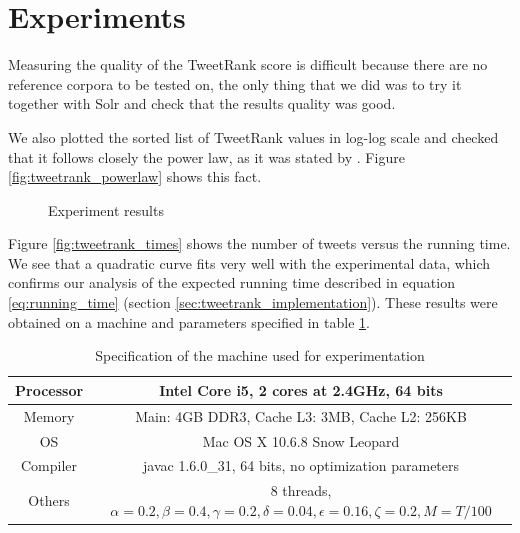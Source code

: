 \section{Experiments}
Measuring the quality of the TweetRank score is difficult because there are no reference corpora to be tested on, the only thing that we did was to try it together with Solr and check that the results quality was good.

We also plotted the sorted list of TweetRank values in log-log scale and checked that it follows closely the power law, as it was stated by \cite{Avrachenkov:2007:MCM:1272804.1272825}. Figure \ref{fig:tweetrank_powerlaw} shows this fact.

\begin{figure}
\centering
{}
\qquad
{} 
\caption{Experiment results}
\end{figure}

Figure \ref{fig:tweetrank_times} shows the number of tweets versus the running time. We see that a quadratic curve fits very well with the experimental data, which confirms our analysis of the expected running time described in equation \ref{eq:running_time} (section \ref{sec:tweetrank_implementation}). These results were obtained on a machine and parameters specified in table \ref{table:machine_spec}. 
\begin{table}
\centering
\begin{tabular}{|c|c|}
\hline Processor & Intel Core i5, 2 cores at 2.4GHz, 64 bits \\
\hline Memory & Main: 4GB DDR3, Cache L3: 3MB, Cache L2: 256KB \\
\hline OS &  Mac OS X 10.6.8 Snow Leopard \\
\hline Compiler & javac 1.6.0\_31, 64 bits, no optimization parameters \\
\hline Others & 8 threads, $\alpha = 0.2, \beta = 0.4, \gamma = 0.2, \delta = 0.04, \epsilon = 0.16, \zeta = 0.2, M = T/100$ \\
\hline
\end{tabular}
\caption{Specification of the machine used for experimentation}
\label{table:machine_spec}
\end{table}

